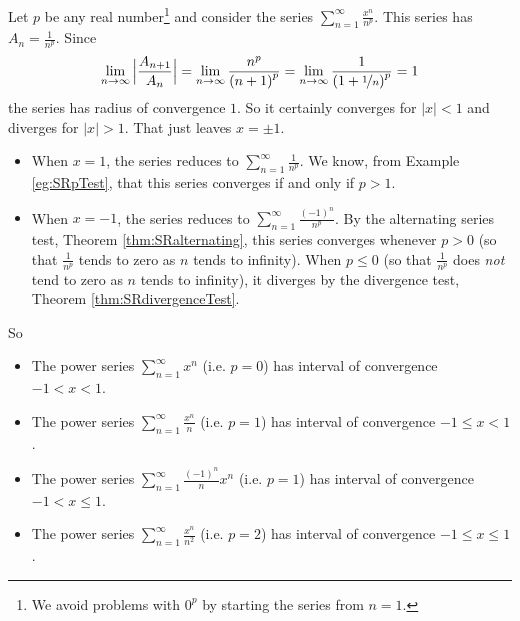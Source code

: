 \begin{eg}\label{eg:SRintervalofconvergence}
Let $p$ be any real number\footnote{
We avoid problems with $0^p$ by starting the series from $n=1$.
} and consider the series
$\sum_{n=1}^\infty \frac{x^n}{n^p}$. This series has $A_n= \frac{1}{n^p}$.
Since
\begin{equation*}
\lim_{n\rightarrow\infty}\Big|\frac{A_{n+1}}{A_n}\Big|
=\lim_{n\rightarrow\infty}\frac{n^p}{{(n+1)}^p}
=\lim_{n\rightarrow\infty}\frac{1}{{(1+\nicefrac{1}{n})}^p}
=1
\end{equation*}
the series has radius of convergence $1$. So it certainly converges for
$|x|<1$ and diverges for $|x|>1$. That just leaves $x=\pm 1$.
\begin{itemize}
\item
When $x=1$, the series reduces to $\sum_{n=1}^\infty \frac{1}{n^p}$.
We know, from Example \ref{eg:SRpTest}, that this series converges if and
only if $p>1$.
\item
When $x=-1$, the series reduces to $\sum_{n=1}^\infty \frac{(-1)^n}{n^p}$.
By the alternating series test, Theorem \ref{thm:SRalternating}, this series
converges whenever $p>0$ (so that $\frac{1}{n^p}$ tends to zero
as $n$ tends to infinity). When $p\le 0$ (so that $\frac{1}{n^p}$ does
\emph{not} tend to zero as $n$ tends to infinity), it diverges by
the divergence test, Theorem \ref{thm:SRdivergenceTest}.
\end{itemize}
So
\begin{itemize}
\item The power series $\sum_{n=1}^\infty x^n$ (i.e. $p=0$)
has interval of convergence $-1<x<1$.
\item The power series $\sum_{n=1}^\infty \frac{x^n}{n}$ (i.e. $p=1$)
has interval of convergence $-1\le x<1$.
\item The power series $\sum_{n=1}^\infty \frac{(-1)^n}{n}x^n$ (i.e. $p=1$)
has interval of convergence $-1< x\le 1$.
\item The power series $\sum_{n=1}^\infty \frac{x^n}{n^2}$ (i.e. $p=2$)
has interval of convergence $-1\le x\le 1$.
\end{itemize}
\end{eg}

